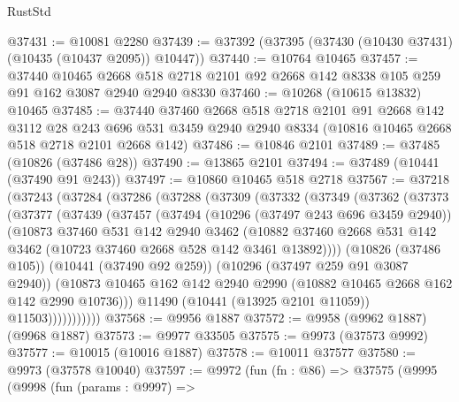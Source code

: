 \begin{lexlean}{RustStd}
\begin{coremodule}
@37431 := @10081 @2280
@37439 := @37392 (@37395 (@37430 (@10430 @37431) (@10435 (@10437 @2095)) @10447))
@37440 := @10764 @10465
@37457 := @37440
    @10465
    @2668
    @518
    @2718
    @2101
    @92
    @2668
    @142
    @8338
    @105
    @259
    @91
    @162
    @3087
    @2940
    @2940
    @8330
@37460 := @10268 (@10615 @13832) @10465
@37485 := @37440
    @37460
    @2668
    @518
    @2718
    @2101
    @91
    @2668
    @142
    @3112
    @28
    @243
    @696
    @531
    @3459
    @2940
    @2940
    @8334
    (@10816 @10465 @2668 @518 @2718 @2101 @2668 @142)
@37486 := @10846 @2101
@37489 := @37485 (@10826 (@37486 @28))
@37490 := @13865 @2101
@37494 := @37489 (@10441 (@37490 @91 @243))
@37497 := @10860 @10465 @518 @2718
@37567 := @37218
    (@37243
      (@37284
        (@37286
          (@37288
            (@37309
              (@37332
                (@37349
                  (@37362
                    (@37373
                      (@37377
                        (@37439
                          (@37457
                            (@37494
                              (@10296 (@37497 @243 @696 @3459 @2940))
                              (@10873
                                @37460
                                @531
                                @142
                                @2940
                                @3462
                                (@10882
                                  @37460
                                  @2668
                                  @531
                                  @142
                                  @3462
                                  (@10723 @37460 @2668 @528 @142 @3461 @13892))))
                            (@10826 (@37486 @105))
                            (@10441 (@37490 @92 @259))
                            (@10296 (@37497 @259 @91 @3087 @2940))
                            (@10873
                              @10465
                              @162
                              @142
                              @2940
                              @2990
                              (@10882 @10465 @2668 @162 @142 @2990 @10736)))
                          @11490
                          (@10441 (@13925 @2101 @11059))
                          @11503)))))))))))
@37568 := @9956 @1887
@37572 := @9958 (@9962 @1887) (@9968 @1887)
@37573 := @9977 @33505
@37575 := @9973 (@37573 @9992)
@37577 := @10015 (@10016 @1887)
@37578 := @10011 @37577
@37580 := @9973 (@37578 @10040)
@37597 := @9972
    (fun (fn : @86) =>
    @37575
      (@9995
        (@9998
          (fun (params : @9997) =>

\end{coremodule}
\end{lexlean}
